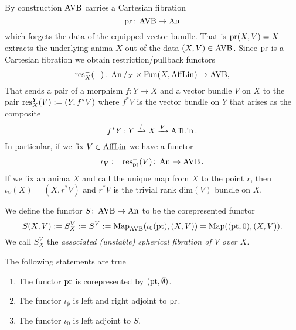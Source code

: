 \begin{construction}\label{construction: mainfunctors}
    By construction $\operatorname{AVB}$ carries a Cartesian fibration
     \[
        \mathrm{pr} \colon \operatorname{AVB} \to \operatorname{An}
     \]
    which forgets the data of the equipped vector bundle. That is 
    $\mathrm{pr}(X,V) = X$ extracts the underlying anima $X$ out of the data $(X,V) \in \operatorname{AVB}$.
    Since $\mathrm{pr}$ is a Cartesian fibration we obtain restriction/pullback functors 
    \[
     \operatorname{res}_X^-(-) \colon \operatorname{An}/_X \times \operatorname{Fun}(X,\operatorname{AffLin}) \to \operatorname{AVB},   
    \]  
    That sends a pair of a morphism $f \colon Y \to X$ and a vector bundle $V$ on $X$ 
    to the pair $\operatorname{res}^Y_X(V) := (Y, f^*V)$ where $f^*V$ is the vector bundle on $Y$ that 
    arises as the composite 
    \[ 
        f^*Y \colon Y \xrightarrow{f} X \xrightarrow{V} \operatorname{AffLin}.
    \]
    In particular, if we fix $V \in \operatorname{AffLin}$ we have a functor
    \[ 
        \iota_V := \operatorname{res}_{\mathrm{pt}}^-(V) \colon \operatorname{An} \to \operatorname{AVB}.     
    \]
    If we fix an anima $X$ and call the unique map from $X$ to the point $r$, then 
    $ \iota_V(X) = (X,r^*V)$ and $r^*V$ is the trivial 
    rank $\mathrm{dim}(V)$ bundle on $X$.

    We define the functor $S \colon \operatorname{AVB} \to \operatorname{An}$ to be the corepresented functor 
    \[ 
    S(X,V) := S^V_X := S^V := \operatorname{Map}_{\operatorname{AVB}}(\iota_0(\mathrm{pt}),(X,V)) = \operatorname{Map}((\mathrm{pt}, 0),(X,V)).    
    \]
    We call $S^V_X$ the \emph{associated (unstable) spherical fibration of $V$ over $X$}.

\end{construction}

\begin{lemma}The following statements are true
    \begin{enumerate}
        \item The functor $\mathrm{pr}$ is corepresented by $(\mathrm{pt}, \emptyset)$.
        \item The functor $\iota_\emptyset$ is left and right adjoint to $\mathrm{pr}$.
        \item The functor $\iota_0$ is left adjoint to $S$.
    \end{enumerate}
    \label{lemma:insight}
\end{lemma}

